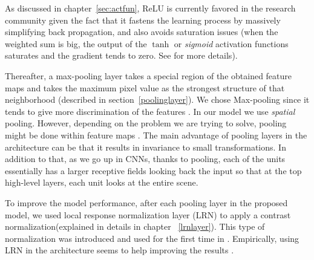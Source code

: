 As discussed in chapter~\ref{sec:actfun}, ReLU is currently favored in the research community given the fact that it fastens the learning process by massively simplifying back propagation, and also avoids saturation issues (when the weighted sum is big, the output of the $\tanh$ or \textit{sigmoid} activation functions saturates and the gradient tends to zero. See \cite{hansen1990neural, amit1987statistical} for more details). 

\indent Thereafter, a max-pooling layer takes a special region of the obtained feature maps and takes the maximum pixel value as the strongest structure of that neighborhood (described in section~\ref{poolinglayer}). We chose Max-pooling since it tends to give more discrimination of the features \cite{boureau2010theoretical}. In our model we use \textit{spatial} pooling. However, depending on the problem we are trying to solve, pooling might be done within feature maps \cite{goodfellow2013maxout}. The main advantage of pooling layers in the architecture can be that it results in invariance to small transformations. In addition to that, as we go up in CNNs, thanks to pooling, each of the units essentially has a larger receptive fields looking back the input so that at the top high-level layers, each unit looks at the entire scene.  

To improve the model performance, after each pooling layer in the proposed model, we used local response normalization layer (LRN) to apply a contrast normalization(explained in details in chapter ~\ref{lrnlayer}). This type of normalization was introduced and used for the first time in \cite{krizhevsky2012imagenet}. Empirically, using LRN in the architecture seems to help improving the results \cite{jarrett2009best, krizhevsky2012imagenet}. 


